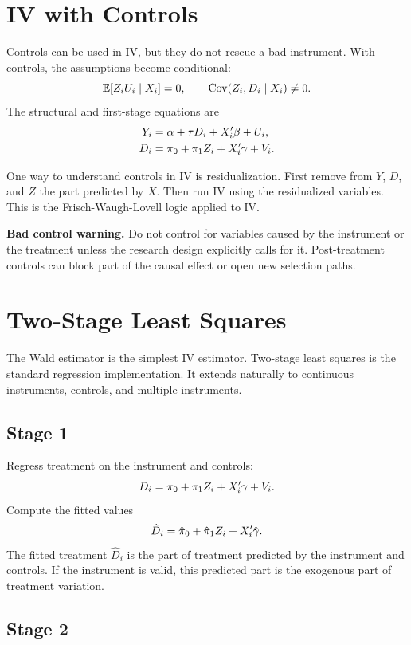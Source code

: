 \section{IV with Controls}

Controls can be used in IV, but they do not rescue a bad instrument. With
controls, the assumptions become conditional:
\[
    \mathbb{E}[Z_i U_i \mid X_i]=0,
    \qquad
    \operatorname{Cov}(Z_i,D_i \mid X_i) \neq 0.
\]
The structural and first-stage equations are
\begin{align}
    Y_i &= \alpha + \tau D_i + X_i'\beta + U_i,\\
    D_i &= \pi_0 + \pi_1 Z_i + X_i'\gamma + V_i.
\end{align}

One way to understand controls in IV is residualization. First remove from
$Y$, $D$, and $Z$ the part predicted by $X$. Then run IV using the residualized
variables. This is the Frisch-Waugh-Lovell logic applied to IV.

\begin{boxF}
\textbf{Bad control warning.} Do not control for variables caused by the
instrument or the treatment unless the research design explicitly calls for it.
Post-treatment controls can block part of the causal effect or open new
selection paths.
\end{boxF}

\section{Two-Stage Least Squares}

The Wald estimator is the simplest IV estimator. Two-stage least squares is the
standard regression implementation. It extends naturally to continuous
instruments, controls, and multiple instruments.

\subsection{Stage 1}

Regress treatment on the instrument and controls:
\[
    D_i = \pi_0 + \pi_1 Z_i + X_i'\gamma + V_i.
\]
Compute the fitted values
\[
    \hat{D}_i = \hat{\pi}_0 + \hat{\pi}_1 Z_i + X_i'\hat{\gamma}.
\]
The fitted treatment $\hat{D}_i$ is the part of treatment predicted by the
instrument and controls. If the instrument is valid, this predicted part is the
exogenous part of treatment variation.

\subsection{Stage 2}

